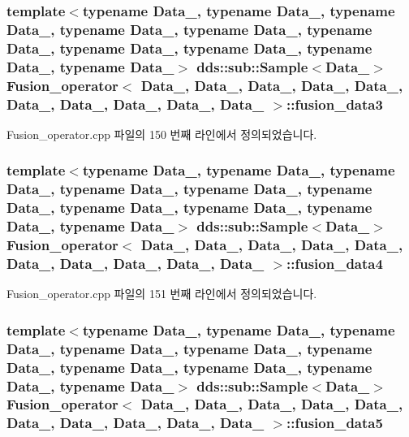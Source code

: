 \subsubsection[{\texorpdfstring{fusion\+\_\+data3}{fusion_data3}}]{\setlength{\rightskip}{0pt plus 5cm}template$<$typename Data\+\_, typename Data\+\_, typename Data\+\_, typename Data\+\_, typename Data\+\_, typename Data\+\_, typename Data\+\_, typename Data\+\_, typename Data\+\_, typename Data\+\_$>$ dds\+::sub\+::\+Sample$<$Data\+\_$>$ {\bf Fusion\+\_\+operator}$<$ Data\+\_, Data\+\_, Data\+\_, Data\+\_, Data\+\_, Data\+\_, Data\+\_, Data\+\_, Data\+\_, Data\+\_ $>$\+::fusion\+\_\+data3}\hypertarget{classFusion__operator_a983008a895d0902a9aafc471af7681a5}{}\label{classFusion__operator_a983008a895d0902a9aafc471af7681a5}


Fusion\+\_\+operator.\+cpp 파일의 150 번째 라인에서 정의되었습니다.

\subsubsection[{\texorpdfstring{fusion\+\_\+data4}{fusion_data4}}]{\setlength{\rightskip}{0pt plus 5cm}template$<$typename Data\+\_, typename Data\+\_, typename Data\+\_, typename Data\+\_, typename Data\+\_, typename Data\+\_, typename Data\+\_, typename Data\+\_, typename Data\+\_, typename Data\+\_$>$ dds\+::sub\+::\+Sample$<$Data\+\_$>$ {\bf Fusion\+\_\+operator}$<$ Data\+\_, Data\+\_, Data\+\_, Data\+\_, Data\+\_, Data\+\_, Data\+\_, Data\+\_, Data\+\_, Data\+\_ $>$\+::fusion\+\_\+data4}\hypertarget{classFusion__operator_a40f85d88738eca58c412f0b70792678f}{}\label{classFusion__operator_a40f85d88738eca58c412f0b70792678f}


Fusion\+\_\+operator.\+cpp 파일의 151 번째 라인에서 정의되었습니다.

\subsubsection[{\texorpdfstring{fusion\+\_\+data5}{fusion_data5}}]{\setlength{\rightskip}{0pt plus 5cm}template$<$typename Data\+\_, typename Data\+\_, typename Data\+\_, typename Data\+\_, typename Data\+\_, typename Data\+\_, typename Data\+\_, typename Data\+\_, typename Data\+\_, typename Data\+\_$>$ dds\+::sub\+::\+Sample$<$Data\+\_$>$ {\bf Fusion\+\_\+operator}$<$ Data\+\_, Data\+\_, Data\+\_, Data\+\_, Data\+\_, Data\+\_, Data\+\_, Data\+\_, Data\+\_, Data\+\_ $>$\+::fusion\+\_\+data5}\hypertarget{classFusion__operator_a770f79170f64f611facd933ebb1c9b58}{}\label{classFusion__operator_a770f79170f64f611facd933ebb1c9b58}


